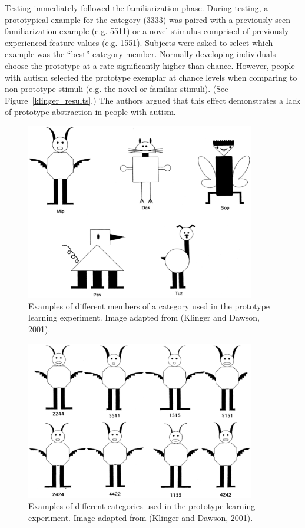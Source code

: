 \documentclass[man]{apa}
\begin{document}
Testing immediately followed the familiarization phase.  During testing, a prototypical example for the category (3333) was paired with a previously seen familiarization example (e.g. 5511) or a novel stimulus comprised of previously experienced feature values (e.g. 1551).  Subjects were asked to select which example was the ``best'' category member.  Normally developing individuals choose the prototype at a rate significantly higher than chance.  However, people with autism selected the prototype exemplar at chance levels when comparing to non-prototype stimuli (e.g. the novel or familiar stimuli). (See Figure~\ref{klinger_results}.)  The authors argued that this effect demonstrates a lack of prototype abstraction in people with autism.  

\begin{figure}[ht]
\begin{center}
	\includegraphics[width=100mm]{figures/prototype_categories.eps}
\end{center}
\caption{Examples of different members of a category used in the prototype learning experiment.  Image adapted from (Klinger and Dawson, 2001).}
\label{prototype-categories}
\end{figure} 

\begin{figure}[ht]
\begin{center}
	\includegraphics[width=100mm]{figures/mip_familiarization.eps}
\end{center}
\caption{Examples of different categories used in the prototype learning experiment.  Image adapted from (Klinger and Dawson, 2001).}
\label{mip-familiarization}
\end{figure} 
\end{document}
